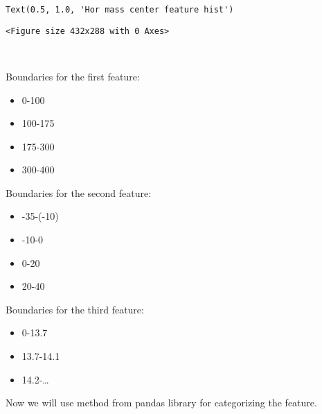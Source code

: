             \begin{tcolorbox}[breakable, size=fbox, boxrule=.5pt, pad at break*=1mm, opacityfill=0]
\begin{Verbatim}[commandchars=\\\{\}]
Text(0.5, 1.0, 'Hor mass center feature hist')
\end{Verbatim}
\end{tcolorbox}
        
    
    \begin{verbatim}
<Figure size 432x288 with 0 Axes>
    \end{verbatim}

    
    \begin{center}
    \end{center}
    { \hspace*{\fill} \\}
    
    Boundaries for the first feature:

\begin{itemize}
\item
  0-100
\item
  100-175
\item
  175-300
\item
  300-400
\end{itemize}

Boundaries for the second feature:

\begin{itemize}
\item
  -35-(-10)
\item
  -10-0
\item
  0-20
\item
  20-40
\end{itemize}

Boundaries for the third feature:

\begin{itemize}
\item
  0-13.7
\item
  13.7-14.1
\item
  14.2-\ldots{}
\end{itemize}

Now we will use method from pandas library for categorizing the feature.

